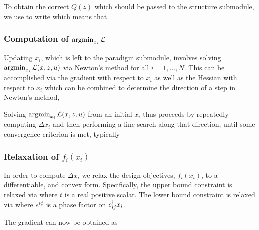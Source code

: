 \documentclass{book}
\begin{document}
To obtain the correct $Q(z)$ which should be passed to the structure submodule,
    we use  to write
    which means that

\subsubsection{Computation of $\mathop{\rm argmin}_{x_i} \mathcal{L}$}
Updating $x_i$, which is left to the paradigm submodule,
    involves solving $\mathop{\rm argmin}_{x_i} \mathcal{L}(x, z, u)$ via Newton's method for all $i = 1, \ldots, N$.
This can be accomplished via the gradient with respect to $x_i$
    as well as the Hessian with respect to $x_i$
    which can be combined to determine the direction of a step in Newton's method,

Solving $\mathop{\rm argmin}_{x_i} \mathcal{L}(x, z, u)$ from an initial $x_i$ thus proceeds by
    repeatedly computing $\Delta x_i$ and then performing a line search along that direction,
    until some convergence criterion is met, typically

\subsubsection{Relaxation of $f_i(x_i)$}
In order to compute $\Delta x_i$ we relax the design objectives, $f_i(x_i)$, to a differentiable, and convex form.
Specifically, the upper bound constraint is relaxed via
    where $t$ is a real positive scalar. The lower bound constraint is relaxed via
     where $e^{i\phi}$ is a phase factor on $c^\dagger_{ij} x_i$.

The gradient can now be obtained as
% 
%     
\end{document}
